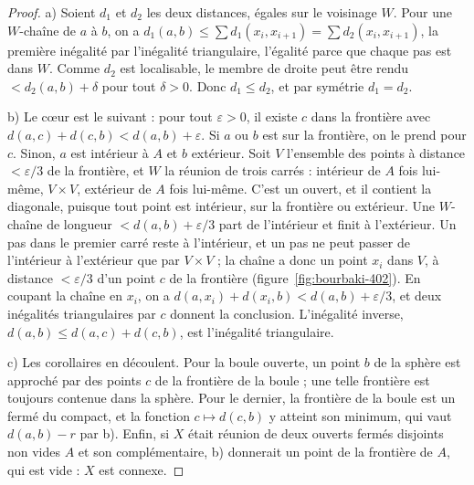 \begin{proof}
a) Soient $d_1$ et $d_2$ les deux distances, égales sur le voisinage $W$. Pour une $W$-chaîne de $a$ à $b$, on a $d_1(a, b) \leq \sum d_1(x_i, x_{i+1}) = \sum d_2(x_i, x_{i+1})$, la première inégalité par l'inégalité triangulaire, l'égalité parce que chaque pas est dans $W$. Comme $d_2$ est localisable, le membre de droite peut être rendu $< d_2(a, b) + \delta$ pour tout $\delta > 0$. Donc $d_1 \leq d_2$, et par symétrie $d_1 = d_2$.

b) Le cœur est le suivant : pour tout $\varepsilon > 0$, il existe $c$ dans la frontière avec $d(a, c) + d(c, b) < d(a, b) + \varepsilon$. Si $a$ ou $b$ est sur la frontière, on le prend pour $c$. Sinon, $a$ est intérieur à $A$ et $b$ extérieur. Soit $V$ l'ensemble des points à distance $< \varepsilon/3$ de la frontière, et $W$ la réunion de trois carrés : intérieur de $A$ fois lui-même, $V \times V$, extérieur de $A$ fois lui-même. C'est un ouvert, et il contient la diagonale, puisque tout point est intérieur, sur la frontière ou extérieur. Une $W$-chaîne de longueur $< d(a, b) + \varepsilon/3$ part de l'intérieur et finit à l'extérieur. Un pas dans le premier carré reste à l'intérieur, et un pas ne peut passer de l'intérieur à l'extérieur que par $V \times V$ ; la chaîne a donc un point $x_i$ dans $V$, à distance $< \varepsilon/3$ d'un point $c$ de la frontière (figure~\ref{fig:bourbaki-402}). En coupant la chaîne en $x_i$, on a $d(a, x_i) + d(x_i, b) < d(a, b) + \varepsilon/3$, et deux inégalités triangulaires par $c$ donnent la conclusion. L'inégalité inverse, $d(a, b) \leq d(a, c) + d(c, b)$, est l'inégalité triangulaire.

c) Les corollaires en découlent. Pour la boule ouverte, un point $b$ de la sphère est approché par des points $c$ de la frontière de la boule ; une telle frontière est toujours contenue dans la sphère. Pour le dernier, la frontière de la boule est un fermé du compact, et la fonction $c \mapsto d(c, b)$ y atteint son minimum, qui vaut $d(a, b) - r$ par b). Enfin, si $X$ était réunion de deux ouverts fermés disjoints non vides $A$ et son complémentaire, b) donnerait un point de la frontière de $A$, qui est vide : $X$ est connexe.
\end{proof}

